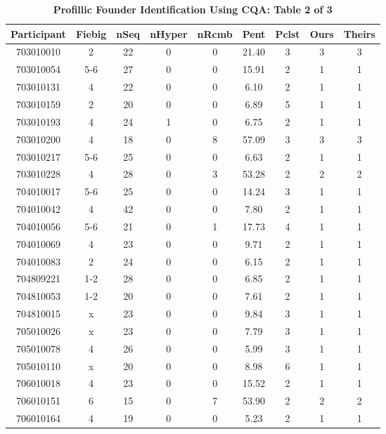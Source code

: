 \documentclass[preprint,12pt,authoryear]{elsarticle}
\begin{document}
\begin{table}
\centering
\begin{tabular}{cc | ccc | cc | cc}
  \hline
Participant & Fiebig & nSeq & nHyper & nRcmb & Pent & Pclst & Ours & Theirs \\ 
  \hline
  703010010 &  2 &  22 &   0 &   0 & 21.40 &   3 & 3 &   3 \\ 
  703010054 &  5-6 &  27 &   0 &   0 & 15.91 &   2 & 1 &   1 \\ 
  703010131 &  4 &  22 &   0 &   0 & 6.10 &   2 & 1 &   1 \\ 
  703010159 &  2 &  20 &   0 &   0 & 6.89 &   5 & 1 &   1 \\ 
  703010193 &  4 &  24 &   1 &   0 & 6.75 &   2 & 1 &   1 \\ 
  703010200 &  4 &  18 &   0 &   8 & 57.09 &   3 & 3 &   3 \\ 
  703010217 &  5-6 &  25 &   0 &   0 & 6.63 &   2 & 1 &   1 \\ 
  703010228 &  4 &  28 &   0 &   3 & 53.28 &   2 & 2 &   2 \\ 
  704010017 &  5-6 &  25 &   0 &   0 & 14.24 &   3 & 1 &   1 \\ 
  704010042 &  4 &  42 &   0 &   0 & 7.80 &   2 & 1 &   1 \\ 
  704010056 &  5-6 &  21 &   0 &   1 & 17.73 &   4 & 1 &   1 \\ 
  704010069 &  4 &  23 &   0 &   0 & 9.71 &   2 & 1 &   1 \\ 
  704010083 &  2 &  24 &   0 &   0 & 6.15 &   2 & 1 &   1 \\ 
  704809221 &  1-2 &  28 &   0 &   0 & 6.85 &   2 & 1 &   1 \\ 
  704810053 &  1-2 &  20 &   0 &   0 & 7.61 &   2 & 1 &   1 \\ 
  704810015 &  x &  23 &   0 &   0 & 9.84 &   3 & 1 &   1 \\ 
  705010026 &  x &  23 &   0 &   0 & 7.79 &   3 & 1 &   1 \\ 
  705010078 &  4 &  26 &   0 &   0 & 5.99 &   3 & 1 &   1 \\ 
  705010110 &  x &  20 &   0 &   0 & 8.98 &   6 & 1 &   1 \\ 
  706010018 &  4 &  23 &   0 &   0 & 15.52 &   2 & 1 &   1 \\ 
  706010151 &  6 &  15 &   0 &   7 & 53.90 &   2 & 2 &   2 \\ 
  706010164 &  4 &  19 &   0 &   0 & 5.23 &   2 & 1 &   1 \\ 
   \hline
\end{tabular}
\caption{\textbf{Profillic Founder Identification Using CQA: Table 2 of 3}}
\label{tbl:AbrahamsFoundersVsProfillicFounders-b}
\end{table}
 
\end{document}
